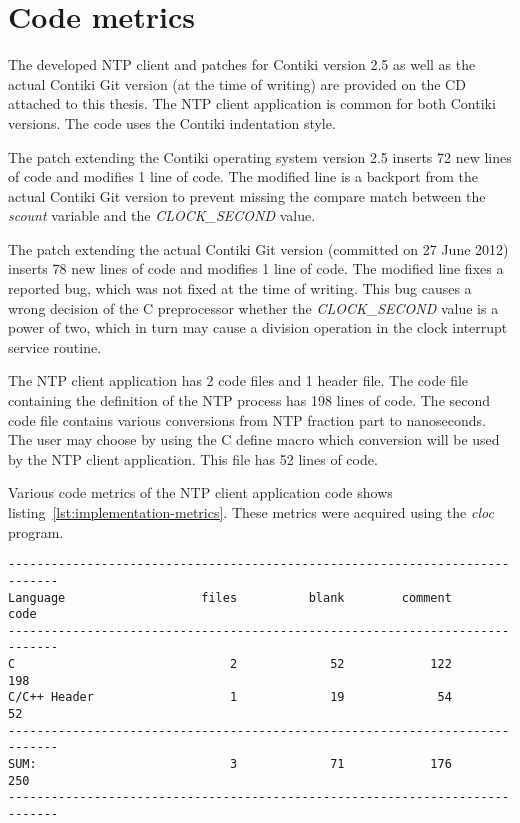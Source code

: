 
\section{Code metrics}
The developed NTP client and patches for Contiki version 2.5
as well as the actual Contiki Git version (at the time of writing)
are provided on the CD attached to this thesis.
The NTP client application is common for both Contiki versions.
The code uses the Contiki indentation style.

The patch extending the Contiki operating system version 2.5
inserts 72 new lines of code and modifies 1 line of code.
The modified line is a backport from the actual Contiki Git version to prevent
missing the compare match between the {\it{scount}} variable and
the {\it{CLOCK\_SECOND}} value.

The patch extending the actual Contiki Git version
(committed on 27 June 2012) 
inserts 78 new lines of code and modifies 1 line of code.
The modified line fixes a reported bug, which was not fixed at the time of writing.
This bug causes a wrong decision of the C preprocessor whether the {\it{CLOCK\_SECOND}}
value is a power of two, which in turn may cause a division operation in
the clock interrupt service routine.

The NTP client application has 2 code files and 1 header file.
The code file containing the definition of the NTP process
has 198 lines of code.
The second code file contains various conversions from NTP fraction part
to nanoseconds.
The user may choose by using the C define macro which conversion will be used
by the NTP client application.
This file has 52 lines of code.

Various code metrics of the NTP client application code
shows listing~\ref{lst:implementation-metrics}.
These metrics were acquired using the {\it{cloc}} program.
\begin{lstlisting}[caption={NTP client application code metrics},label={lst:implementation-metrics}]
-----------------------------------------------------------------------------
Language                   files          blank        comment           code
-----------------------------------------------------------------------------
C                              2             52            122            198
C/C++ Header                   1             19             54             52
-----------------------------------------------------------------------------
SUM:                           3             71            176            250
-----------------------------------------------------------------------------
\end{lstlisting}
